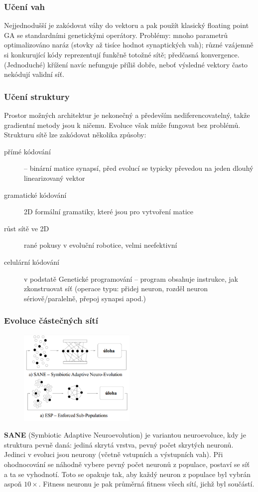 \subsubsection{Učení vah}
Nejjednodušší je zakódovat váhy do vektoru a pak použít klasický floating point GA se standardními genetickými operátory. Problémy: mnoho parametrů optimalizováno naráz (stovky až tisíce hodnot synaptických vah); různé vzájemně si konkurující kódy reprezentují funkčně totožné sítě; předčasná konvergence. (Jednoduché) křížení navíc nefunguje příliš dobře, neboť výsledné vektory často nekódují validní síť.

\subsubsection{Učení struktury}
Prostor možných architektur je nekonečný a především nediferencovatelný, takže gradientní metody jsou k ničemu. Evoluce však může fungovat bez problémů.
Strukturu sítě lze zakódovat několika způsoby:
\begin{description}
	
	
	\item[přímé kódování] -- binární matice synapsí, před evolucí se typicky převedou na jeden dlouhý linearizovaný vektor 
	\item[gramatické kódování] 2D formální gramatiky, které jsou  pro vytvoření matice	
	\item[růst sítě ve 2D] rané pokusy v evoluční robotice, velmi neefektivní
	\item[celulární kódování] v podstatě Genetické programování -- program obsahuje instrukce, jak zkonstruovat síť (operace typu: přidej neuron, rozděl neuron sériově/paralelně, přepoj synapsi apod.)
\end{description}

\subsubsection{Evoluce částečných sítí}
\setlength\intextsep{0pt}
\begin{figure}
	\includegraphics[width=0.5\textwidth]{img/sane_esp.png}
\end{figure}
\textbf{SANE} (Symbiotic Adaptive Neuroevolution) je variantou neuroevoluce, kdy je struktura pevně daná: jediná skrytá vrstva, pevný počet skrytých neuronů. Jedinci v evoluci jsou neurony (včetně vstupních a výstupních vah). Při ohodnocování se náhodně vybere pevný počet neuronů z populace, postaví se síť a ta se vyhodnotí. Toto se opakuje tak, aby každý neuron z populace byl vybrán aspoň $10\times$. Fitness neuronu je pak průměrná fitness všech sítí, jichž byl součástí.

